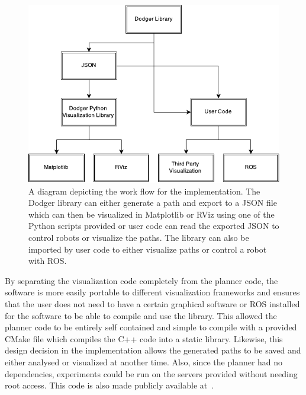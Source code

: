 
\begin{figure}[h!]

    \centering

    \includegraphics[width=0.8\linewidth]{figs/toolchain}

    \caption{A diagram depicting the work flow for the implementation. The
    Dodger library can either generate a path and export to a JSON file which
can then be visualized in Matplotlib or RViz using one of the Python scripts
provided or user code can read the exported JSON to control robots or visualize
the paths. The library can also be imported by user code to either visualize
paths or control a robot with ROS.}

    \label{fig:software}

\end{figure}

By separating the visualization code completely from the planner code, the
software is more easily portable to different visualization frameworks and
ensures that the user does not need to have a certain graphical software or ROS
installed for the software to be able to compile and use the library. This
allowed the planner code to be entirely self contained and simple to compile
with a provided CMake file which compiles the C++ code into a static library.
Likewise, this design decision in the implementation allows the generated paths
to be saved and either analysed or visualized at another time.  Also, since the
planner had no dependencies, experiments could be run on the servers provided
without needing root access.  This code is also made publicly available
at~\cite{dodger}.


